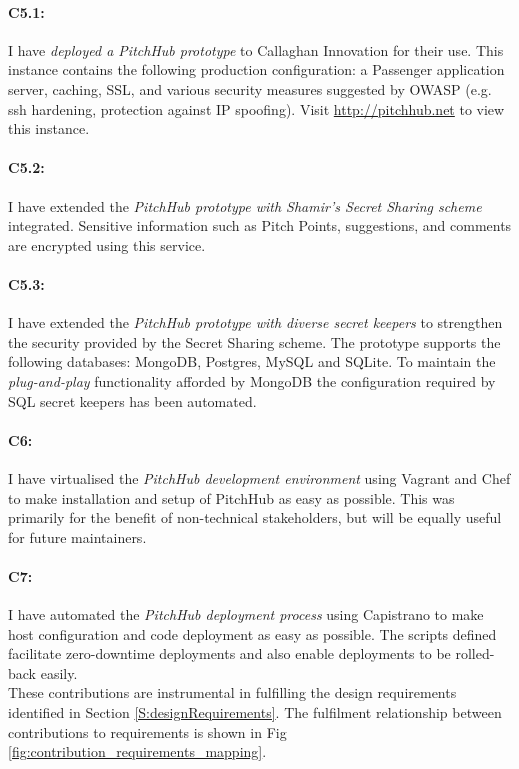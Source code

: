 \paragraph{C5.1:} I have {\em deployed a PitchHub prototype} to Callaghan Innovation for their use. This instance contains the following production configuration: a Passenger application server, caching, SSL, and various security measures suggested by OWASP (e.g. ssh hardening, protection against IP spoofing). Visit \url{http://pitchhub.net} to view this instance.


\paragraph{C5.2:} I have extended the {\em PitchHub prototype with Shamir's Secret Sharing scheme} integrated. Sensitive information such as Pitch Points, suggestions, and comments are encrypted using this service.

\paragraph{C5.3:} I have extended the {\em PitchHub prototype with diverse secret keepers} to strengthen the security provided by the Secret Sharing scheme. The prototype supports the following databases: MongoDB, Postgres, MySQL and SQLite. To maintain the \textit{plug-and-play} functionality afforded by MongoDB the configuration required by SQL secret keepers has been automated.

\paragraph{C6:} I have virtualised the {\em PitchHub development environment} using Vagrant and Chef to make installation and setup of PitchHub as easy as possible. This was primarily for the benefit of non-technical stakeholders, but will be equally useful for future maintainers.

\paragraph{C7:} I have automated the {\em PitchHub deployment process} using Capistrano to make host configuration and code deployment as easy as possible. The scripts defined facilitate zero-downtime deployments and also enable deployments to be rolled-back easily.
\\
\newline
These contributions are instrumental in fulfilling the design requirements identified in Section \ref{S:designRequirements}. The fulfilment relationship between contributions to requirements is shown in Fig \ref{fig:contribution_requirements_mapping}.

